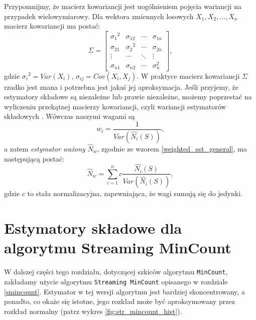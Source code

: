 Przypomnijmy, że macierz kowariancji jest uogólnieniem pojęcia wariancji na przypadek wielowymiarowy. Dla wektora zmiennych losowych $X_1, X_2, \ldots, X_n$ macierz kowariancji ma postać:
\[
\Sigma =
  \begin{bmatrix}
    {{\sigma}_1}^2 & {\sigma}_{12} & \cdots & {\sigma}_{1n}  \\
    {{\sigma}_{21}} & {{\sigma}_{2}}^2 & \cdots & {\sigma}_{2n} \\
    \vdots & \cdots & \ddots & \vdots \\
    {{\sigma}_{n1}} & {{\sigma}_{n2}} & \cdots & {{\sigma}_{n}^2}
  \end{bmatrix},
\]
gdzie
    ${{\sigma}_i}^2 = Var(X_i)$,
    ${\sigma}_{ij} = Cov(X_i, X_j)$.
W praktyce macierz kowariancji $\Sigma$ rzadko jest znana i potrzebna jest jakaś jej aproksymacja.
Jeśli przyjemy, że estymatory składowe są niezależne
lub prawie niezależne, możemy poprzestać na wyliczeniu przekątnej macierzy kowariancji, czyli wariancji estymatorów składowych \cite{ting}. Wówczas naszymi wagami są $$w_i = \frac{1}{Var(\hat{N_i}(S))},$$ a zatem \textit{estymator ważony} $\hat{N}_w$, zgodnie ze wzorem \ref{weighted_est_general}, ma następującą postać:
\begin{equation}
\label{weighted_est}
    \hat{N}_w = \sum_{i=1}^{n}c\frac{\hat{N_i}(S)}{Var(\hat{N_i}(S))},
\end{equation}
gdzie $c$ to stała normalizacyjna, zapewniająca, że wagi sumują się do jedynki.

\section{Estymatory składowe dla algorytmu Streaming MinCount}

W dalszej części tego rozdziału, dotyczącej szkiców algorytmu \texttt{MinCount}, zakładamy użycie algorytmu \texttt{Streaming MinCount} opisanego w rozdziale \ref{smincount}.
Estymator w tej wersji algorytmu jest bardziej skoncentrowany, a ponadto, co okaże się istotne, jego rozkład może być aproksymowany przez rozkład normalny (patrz wykres \ref{fig:str_mincount_hist}). 

